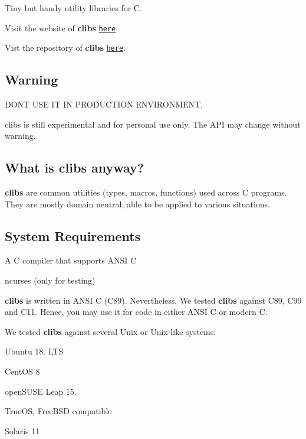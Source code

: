 \href{https://opensource.org/licenses/MIT}{\tt } \href{https://ci.appveyor.com/project/cwchentw/clibs}{\tt }

Tiny but handy utility libraries for C.

Visit the website of {\bfseries clibs} \href{https://cwchentw.github.io/clibs/html/index.html}{\tt here}.

Vist the repository of {\bfseries clibs} \href{https://github.com/cwchentw/clibs/}{\tt here}.

\subsection*{Warning}

D\+ON\textquotesingle{}T U\+SE IT IN P\+R\+O\+D\+U\+C\+T\+I\+ON E\+N\+V\+I\+R\+O\+N\+M\+E\+NT.

clibs is still experimental and for personal use only. The A\+PI may change without warning.

\subsection*{What is clibs anyway?}

{\bfseries clibs} are common utilities (types, macros, functions) used across C programs. They are mostly domain neutral, able to be applied to various situations.

\subsection*{System Requirements}


\begin{DoxyItemize}
\item A C compiler that supports A\+N\+SI C
\item ncurses (only for testing)
\end{DoxyItemize}

{\bfseries clibs} is written in A\+N\+SI C (C89). Nevertheless, We tested {\bfseries clibs} against C89, C99 and C11. Hence, you may use it for code in either A\+N\+SI C or modern C.

We tested {\bfseries clibs} against several Unix or Unix-\/like systems\+:


\begin{DoxyItemize}
\item Ubuntu 18. L\+TS
\item Cent\+OS 8
\item open\+S\+U\+SE Leap 15.
\item True\+OS, Free\+B\+SD compatible
\item Solaris 11
\end{DoxyItemize}

